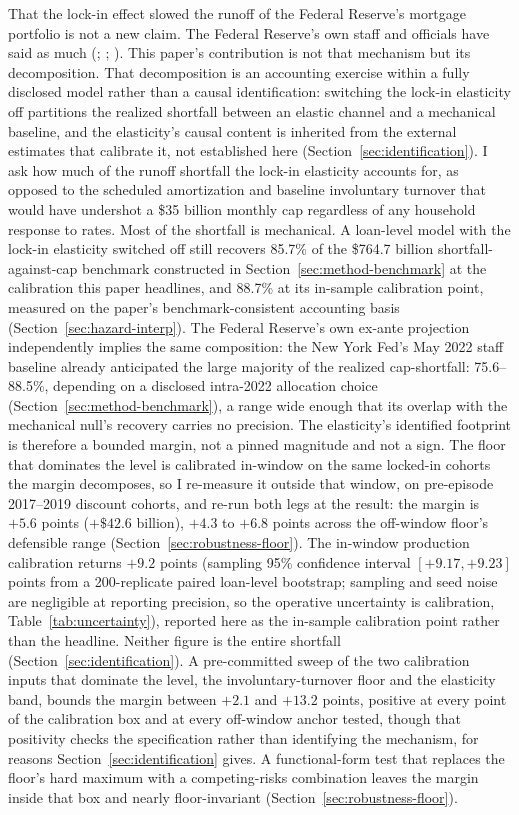 \documentclass[12pt]{article}
\begin{document}
That the lock-in effect slowed the runoff of the Federal Reserve's mortgage portfolio is not a new claim. The Federal Reserve's own staff and officials have said as much (\citealp{na2024}; \citealp{perli2024}; \citealp{hammack2025}). This paper's contribution is not that mechanism but its decomposition. That decomposition is an accounting exercise within a fully disclosed model rather than a causal identification: switching the lock-in elasticity off partitions the realized shortfall between an elastic channel and a mechanical baseline, and the elasticity's causal content is inherited from the external estimates that calibrate it, not established here (Section~\ref{sec:identification}). I ask how much of the runoff shortfall the lock-in elasticity accounts for, as opposed to the scheduled amortization and baseline involuntary turnover that would have undershot a \$35 billion monthly cap regardless of any household response to rates. Most of the shortfall is mechanical. A loan-level model with the lock-in elasticity switched off still recovers 85.7\% of the \$764.7 billion shortfall-against-cap benchmark constructed in Section~\ref{sec:method-benchmark} at the calibration this paper headlines, and 88.7\% at its in-sample calibration point, measured on the paper's benchmark-consistent accounting basis (Section~\ref{sec:hazard-interp}). The Federal Reserve's own ex-ante projection independently implies the same composition: the New York Fed's May 2022 staff baseline already anticipated the large majority of the realized cap-shortfall: 75.6--88.5\%, depending on a disclosed intra-2022 allocation choice (Section~\ref{sec:method-benchmark}), a range wide enough that its overlap with the mechanical null's recovery carries no precision. The elasticity's identified footprint is therefore a bounded margin, not a pinned magnitude and not a sign. The floor that dominates the level is calibrated in-window on the same locked-in cohorts the margin decomposes, so I re-measure it outside that window, on pre-episode 2017--2019 discount cohorts, and re-run both legs at the result: the margin is $+5.6$ points ($+\$42.6$ billion), $+4.3$ to $+6.8$ points across the off-window floor's defensible range (Section~\ref{sec:robustness-floor}). The in-window production calibration returns $+9.2$ points (sampling 95\% confidence interval $[+9.17, +9.23]$ points from a 200-replicate paired loan-level bootstrap; sampling and seed noise are negligible at reporting precision, so the operative uncertainty is calibration, Table~\ref{tab:uncertainty}), reported here as the in-sample calibration point rather than the headline. Neither figure is the entire shortfall (Section~\ref{sec:identification}). A pre-committed sweep of the two calibration inputs that dominate the level, the involuntary-turnover floor and the elasticity band, bounds the margin between $+2.1$ and $+13.2$ points, positive at every point of the calibration box and at every off-window anchor tested, though that positivity checks the specification rather than identifying the mechanism, for reasons Section~\ref{sec:identification} gives. A functional-form test that replaces the floor's hard maximum with a competing-risks combination leaves the margin inside that box and nearly floor-invariant (Section~\ref{sec:robustness-floor}). 
\end{document}
